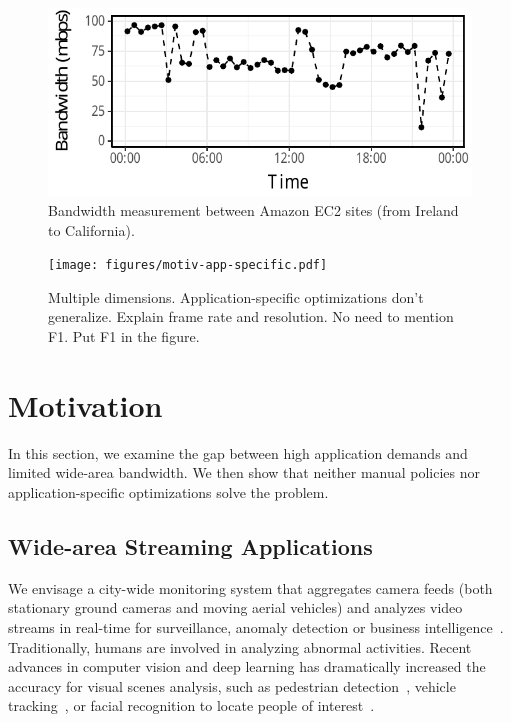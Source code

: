 \begin{figure}
  \centering
  \includegraphics[width=.95\linewidth]{figures/aws-variation.pdf}
  \caption{Bandwidth measurement between Amazon EC2 sites (from Ireland to
    California).}
  \label{fig:bw}
\end{figure}

\begin{figure}
  \centering
  \texttt{[image: figures/motiv-app-specific.pdf]}
  \caption{Multiple dimensions. Application-specific optimizations don't
    generalize. Explain frame rate and resolution. No need to mention F1. Put F1
    in the figure.}
  \label{fig:app-specific}
\end{figure}

\section{Motivation}
\label{sec:motivation}

In this section, we examine the gap between high application demands and limited
wide-area bandwidth. We then show that neither manual policies nor
application-specific optimizations solve the problem.

\subsection{Wide-area Streaming Applications}
\label{sec:wide-area-streaming}

 We envisage a city-wide monitoring system that
aggregates camera feeds (both stationary ground cameras and moving aerial
vehicles) and analyzes video streams in real-time for surveillance, anomaly
detection or business intelligence~\cite{oh2011large}. Traditionally, humans are
involved in analyzing abnormal activities. Recent advances in computer vision
and deep learning has dramatically increased the accuracy for visual scenes
analysis, such as pedestrian detection~\cite{dollar2012pedestrian}, vehicle
tracking~\cite{coifman1998real}, or facial recognition to locate people of
interest~\cite{parkhi2015deep, Lu:2015:SHF:2888116.2888245}.

